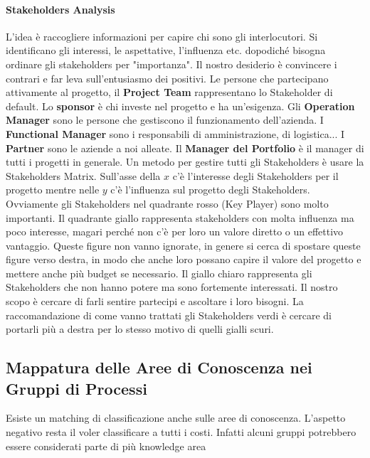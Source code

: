 \paragraph{Stakeholders Analysis}
L'idea è raccogliere informazioni per capire chi sono gli interlocutori. Si identificano gli interessi, le aspettative, l'influenza etc. dopodiché bisogna ordinare gli stakeholders per "importanza". Il nostro desiderio è convincere i contrari e far leva sull'entusiasmo dei positivi.
\noindent Le persone che partecipano attivamente al progetto, il \textbf{Project Team} rappresentano lo Stakeholder di default. Lo \textbf{sponsor} è chi investe nel progetto e ha un'esigenza. Gli \textbf{Operation Manager} sono le persone che gestiscono  il funzionamento dell'azienda. I \textbf{Functional Manager} sono i responsabili di amministrazione, di logistica... I \textbf{Partner} sono le aziende a noi alleate. Il \textbf{Manager del Portfolio} è il manager di tutti i progetti in generale.\newline
Un metodo per gestire tutti gli Stakeholders è usare la Stakeholders Matrix. Sull'asse della $x$ c'è l'interesse degli Stakeholders per il progetto mentre nelle $y$ c'è l'influenza sul progetto degli Stakeholders. Ovviamente gli Stakeholders nel quadrante rosso (Key Player) sono molto importanti. Il quadrante giallo rappresenta stakeholders con molta influenza ma poco interesse, magari perché non c'è per loro un valore diretto o un effettivo vantaggio. Queste figure non vanno ignorate, in genere si cerca di spostare queste figure verso destra, in modo che anche loro possano capire il valore del progetto e mettere anche più budget se necessario.\newline
Il giallo chiaro rappresenta gli Stakeholders che non hanno potere ma sono fortemente interessati. Il nostro scopo è cercare di farli sentire partecipi e ascoltare i loro bisogni. La raccomandazione di come vanno trattati gli Stakeholders verdi è cercare di portarli più a destra per lo stesso motivo di quelli gialli scuri.
\subsection{Mappatura delle Aree di Conoscenza nei Gruppi di Processi}
Esiste un matching di classificazione anche sulle aree di conoscenza. L'aspetto negativo resta il voler classificare a tutti i costi. Infatti alcuni gruppi potrebbero essere considerati parte di più knowledge area
